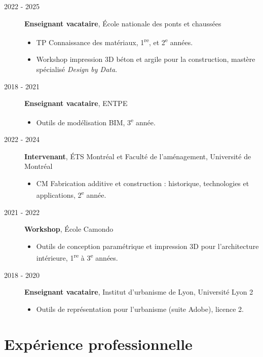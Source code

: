 \documentclass[11pt,a4paper]{article}
\begin{document}
\begin{description}
  \item[2022 - 2025] \textbf{Enseignant vacataire}, École nationale des ponts et chaussées
  \begin{itemize}
    \item TP Connaissance des matériaux, 1\textsuperscript{re}, et  2\textsuperscript{e} années.
    \item Workshop impression 3D béton et argile pour la construction, mastère spécialisé \emph{Design by Data}.
  \end{itemize}

  \item[2018 - 2021] \textbf{Enseignant vacataire}, ENTPE
  \begin{itemize}
    \item Outils de modélisation BIM, 3\textsuperscript{e} année.
  \end{itemize}

  \item[2022 - 2024] \textbf{Intervenant}, ÉTS Montréal et Faculté de l'aménagement, Université de Montréal
  \begin{itemize}
    \item CM Fabrication additive et construction : historique, technologies et applications, 2\textsuperscript{e} année.
  \end{itemize}

  \item[2021 - 2022] \textbf{Workshop}, École Camondo
  \begin{itemize}
    \item Outils de conception paramétrique et impression 3D pour l'architecture intérieure, 1\textsuperscript{re} à 3\textsuperscript{e} années.
  \end{itemize}

  \item[2018 - 2020] \textbf{Enseignant vacataire}, Institut d'urbanisme de Lyon, Université Lyon 2
  \begin{itemize}
    \item Outils de représentation pour l'urbanisme (suite Adobe), licence 2.
  \end{itemize}
\end{description}


\section*{Expérience professionnelle}
\end{document}
